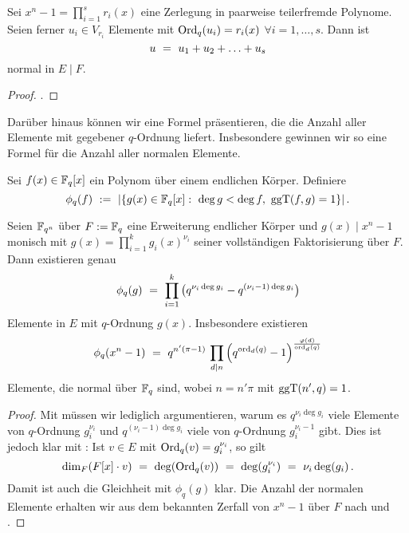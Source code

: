 \begin{kor}
  \label{kor:summe_erzeuger_normal}
  Sei $x^n-1 = \prod_{i=1}^s r_i(x)$ eine Zerlegung in paarweise teilerfremde
  Polynome. Seien ferner $u_i \in V_{r_i}$ Elemente mit 
  $\operatorname{Ord}_q(u_i) = r_i(x)$ $\forall i=1,\ldots,s$. Dann ist
  \[ u \ =\  u_1 + u_2 + \ldots + u_s\]
  normal in $E \mid F$.
\end{kor}
\begin{proof}
  .
\end{proof}

Darüber hinaus können wir  eine
Formel präsentieren, die die Anzahl aller Elemente mit gegebener $q$-Ordnung
liefert. Insbesondere gewinnen wir so eine Formel für die Anzahl aller
normalen Elemente.

\begin{definition}
  \label{def:polynom_phi}
  Sei $f(x) \in \mathbb{F}_q[x]$ ein Polynom über einem endlichen Körper. Definiere
  \[ \phi_q(f) \speq{:=} |\{ g(x) \in \F_q[x]:\ 
    \deg g < \deg f,\ \ggT(f,g) = 1\}|\,.\]
\end{definition}

\begin{satz}
  \label{satz:anzahl_normal}
  Seien $\mathbb{F}_{q^n}$ über $F:=\mathbb{F}_q$ eine Erweiterung endlicher
  Körper und $g(x) \mid x^n-1$ monisch mit $g(x) = \prod_{i=1}^k
  g_i(x)^{\nu_i}$ seiner vollständigen Faktorisierung über $F$. Dann 
  existieren genau
  \[\phi_q(g) \ =\  \prod_{i=1}^k \big( q^{\nu_i\deg g_i} - q^{(\nu_i-1)\deg
    g_i}\big)\]
  Elemente in $E$ mit $q$-Ordnung $g(x)$.
  Insbesondere existieren
  \[ \phi_q(x^n-1) \ =\  q^{n'(\pi-1)}\,\prod_{d\mid n}
    \left( q^{\operatorname{ord}_d(q)} -1 \right)^{\frac{\varphi(d)}{\operatorname{ord}_d(q)}}\]
  Elemente, die normal über $\mathbb{F}_q$ sind, wobei $n = n'\pi$ mit $\operatorname{ggT}(n',q) = 1$.
\end{satz}
\begin{proof}
  Mit  müssen wir lediglich argumentieren, warum
  es $q^{\nu_i\deg g_i}$ viele Elemente von $q$-Ordnung $g_i^{\nu_i}$ und
  $q^{(\nu_i-1)\deg g_i}$ viele von $q$-Ordnung $g_i^{\nu_i-1}$ gibt. Dies ist
  jedoch klar mit \thref{lemma:modul_dim_deg}: Ist $v\in E$ mit 
  $\operatorname{Ord}_q(v) = g_i^{\nu_i}$, so gilt
  \[ \dim_F(F[x]\cdot v) \ =\  \deg(\operatorname{Ord}_q(v))\ =\  \deg(g_i^{\nu_i})
    \ =\  \nu_i \deg(g_i)\,.\]
  Damit ist auch die Gleichheit mit $\phi_q(g)$ klar.
  Die Anzahl der normalen Elemente erhalten wir aus dem bekannten
  Zerfall von $x^n-1$ über $F$ nach 
   und .
\end{proof}


